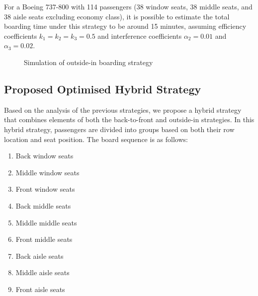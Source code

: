 \documentclass[12pt]{article}
\begin{document}
For a Boeing 737-800 with 114 passengers (38 window seats, 38 middle seats, and 38 aisle seats excluding economy class), it is possible to estimate the total boarding time under this strategy to be around 15 minutes, assuming efficiency coefficients $k_1 = k_2 = k_3 = 0.5$ and interference coefficients $\alpha_2 = 0.01$ and $\alpha_3 = 0.02$.

\begin{figure}[H]
\centering
{}
\caption{Simulation of outside-in boarding strategy}
\end{figure}

\subsection{Proposed Optimised Hybrid Strategy}

Based on the analysis of the previous strategies, we propose a hybrid strategy that combines elements of both the back-to-front and outside-in strategies. In this hybrid strategy, passengers are divided into groups based on both their row location and seat position. The board sequence is as follows:

\begin{enumerate}
    \item Back window seats
    \item Middle window seats
    \item Front window seats
    \item Back middle seats
    \item Middle middle seats
    \item Front middle seats
    \item Back aisle seats
    \item Middle aisle seats
    \item Front aisle seats
\end{enumerate}
\end{document}
